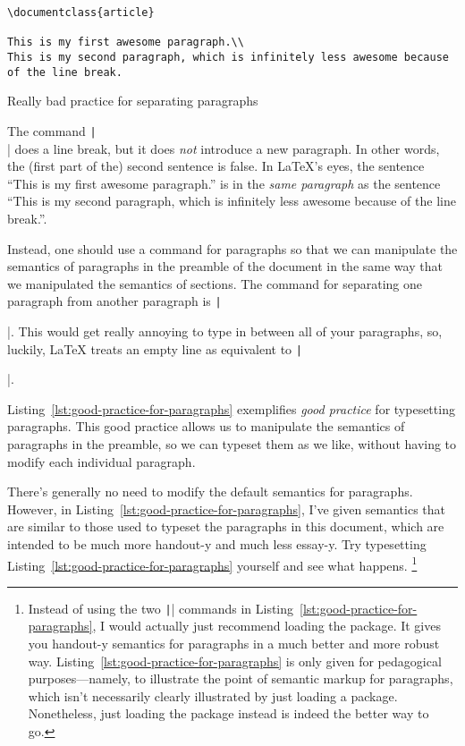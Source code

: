 \begin{listing}[htbp]
	\centering
	\begin{verbatim}
\documentclass{article}

This is my first awesome paragraph.\\
This is my second paragraph, which is infinitely less awesome because of the line break.

	\end{verbatim}
	\caption{Really bad practice for separating paragraphs}
	\label{lst:bad-practice-with-line-breaks}
\end{listing}

The command \texttt|\\| does a line break, but it does \emph{not} introduce a new paragraph.
In other words, the (first part of the) second sentence is false.
In \LaTeX{}'s eyes, the sentence ``This is my first awesome paragraph.'' is in the \emph{same paragraph} as the sentence ``This is my second paragraph, which is infinitely less awesome because of the line break.''.

Instead, one should use a command for paragraphs so that we can manipulate the semantics of paragraphs in the preamble of the document in the same way that we manipulated the semantics of sections.
The command for separating one paragraph from another paragraph is \texttt|\par|.
This would get really annoying to type in between all of your paragraphs, so, luckily, \LaTeX{} treats an empty line as equivalent to \texttt|\par|.

Listing~\ref{lst:good-practice-for-paragraphs} exemplifies \emph{good practice} for typesetting paragraphs.
This good practice allows us to manipulate the semantics of paragraphs in the preamble, so we can typeset them as we like, without having to modify each individual paragraph.

There's generally no need to modify the default semantics for paragraphs.
However, in Listing~\ref{lst:good-practice-for-paragraphs}, I've given semantics that are similar to those used to typeset the paragraphs in this document, which are intended to be much more handout-y and much less essay-y.
Try typesetting Listing~\ref{lst:good-practice-for-paragraphs} yourself and see what happens.%
\footnote{%
Instead of using the two \texttt|\setlength| commands in Listing~\ref{lst:good-practice-for-paragraphs}, I would actually just recommend loading the  package.
It gives you handout-y semantics for paragraphs in a much better and more robust way.
Listing~\ref{lst:good-practice-for-paragraphs} is only given for pedagogical purposes---namely, to illustrate the point of semantic markup for paragraphs, which isn't necessarily clearly illustrated by just loading a package.
Nonetheless, just loading the  package instead is indeed the better way to go.%
}

